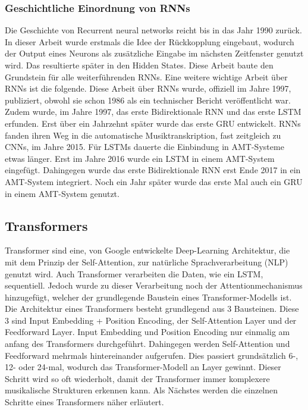 \subsubsection{Geschichtliche Einordnung von RNNs}
Die Geschichte von Recurrent neural networks reicht bis in das Jahr 1990 zurück.
\cite{elman1990finding}
In dieser Arbeit wurde erstmals die Idee der Rückkopplung eingebaut,
wodurch der Output eines Neurons als zusätzliche Eingabe im nächsten Zeitfenster genutzt wird.
Das resultierte später in den Hidden States.
Diese Arbeit baute den Grundstein für alle weiterführenden RNNs.
Eine weitere wichtige Arbeit über RNNs ist die folgende.
\cite{jordan1997serial}
Diese Arbeit über RNNs wurde, offiziell im Jahre 1997, publiziert,
obwohl sie schon 1986 als ein technischer Bericht veröffentlicht war.
Zudem wurde, im Jahre 1997, das erste Bidirektionale RNN
\cite{schuster1997bidirectional}
und das erste LSTM erfunden.
\cite{hochreiter1997long}
Erst über ein Jahrzehnt später wurde das erste GRU entwickelt.
\cite{chung2014empirical}
RNNs fanden ihren Weg in die automatische Musiktranskription, fast zeitgleich zu CNNs, im Jahre 2015.
\cite{sigtia2015hybrid}
Für LSTMs dauerte die Einbindung in AMT-Systeme etwas länger.
Erst im Jahre 2016 wurde ein LSTM in einem AMT-System eingefügt.
\cite{sigtia2016end}
Dahingegen wurde das erste Bidirektionale RNN erst Ende 2017 in ein AMT-System integriert.
\cite{hawthorne2017onsets}
Noch ein Jahr später wurde das erste Mal auch ein GRU in einem AMT-System genutzt.
\cite{jung2018adaptive}

\subsection{Transformers}
Transformer sind eine, von Google entwickelte Deep-Learning Architektur,
die mit dem Prinzip der Self-Attention, zur natürliche Sprachverarbeitung (NLP) genutzt wird.
Auch Transformer verarbeiten die Daten, wie ein LSTM, sequentiell.
Jedoch wurde zu dieser Verarbeitung noch der Attentionmechanismus hinzugefügt,
welcher der grundlegende Baustein eines Transformer-Modells ist.
Die Architektur eines Transformers besteht grundlegend aus 3 Bausteinen.
Diese 3 sind Input Embedding + Position Encoding, der Self-Attention Layer und der Feedforward Layer.
Input Embedding und Position Encoding nur einmalig am anfang des Transformers durchgeführt.
Dahingegen werden Self-Attention und Feedforward mehrmals hintereinander aufgerufen.
Dies passiert grundsätzlich 6-, 12- oder 24-mal, wodurch das Transformer-Modell an Layer gewinnt.
Dieser Schritt wird so oft wiederholt, damit der Transformer immer komplexere musikalische Strukturen erkennen kann.
Als Nächstes werden die einzelnen Schritte eines Transformers näher erläutert.

